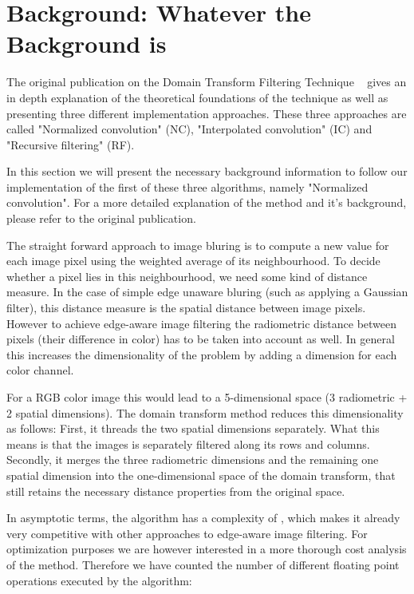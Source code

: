 \section{Background: Whatever the Background is}\label{sec:background}

The original publication on the Domain Transform Filtering Technique ~\cite{GastalOliveira2011DomainTransform} gives  an in depth explanation of the theoretical foundations of the technique as well as presenting three different implementation approaches. These three approaches are called "Normalized convolution" (NC), "Interpolated convolution" (IC) and "Recursive filtering" (RF). 

In this section we will present the necessary background information to follow our implementation of the first of these three algorithms, namely "Normalized convolution". For a more detailed explanation of the method and it's background, please refer to the original publication.

The straight forward approach to image bluring is to compute a new value for each image pixel using the weighted average of its neighbourhood. To decide whether a pixel lies in this neighbourhood, we need some kind of distance measure. In the case of simple edge unaware bluring (such as applying a Gaussian filter), this distance measure is the spatial distance between image pixels. However to achieve edge-aware image filtering the radiometric distance between pixels (their difference in color) has to be taken into account as well.
In general this increases the dimensionality of the problem by adding a dimension for each color channel.

For a RGB color image this would lead to a 5-dimensional space (3 radiometric + 2 spatial dimensions). The domain transform method reduces this dimensionality as follows:
First, it threads the two spatial dimensions separately. What this means is that the images is separately filtered along its rows and columns. Secondly, it merges the three radiometric dimensions and the remaining one spatial dimension into the one-dimensional space of the domain transform, that still retains the necessary distance properties from the original space.


In asymptotic terms, the algorithm has a complexity of , which makes it already very competitive with other approaches to edge-aware image filtering. For optimization purposes we are however interested in a more thorough cost analysis of the method. Therefore we have counted the number of different floating point operations executed by the algorithm:



